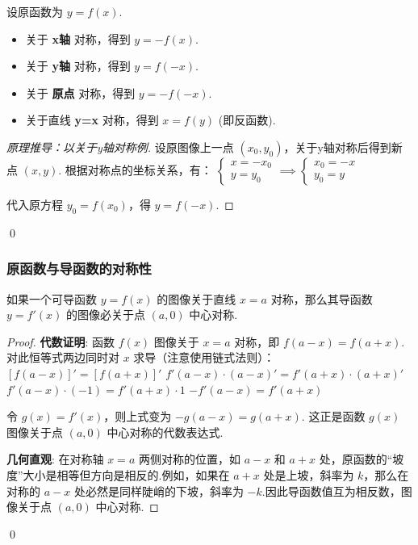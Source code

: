 \begin{theorem}[对称变换法则]
	设原函数为 $y=f(x)$.
	\begin{itemize}
		\item 关于 \textbf{x轴} 对称，得到 $y = -f(x)$.
		\item 关于 \textbf{y轴} 对称，得到 $y = f(-x)$.
		\item 关于 \textbf{原点} 对称，得到 $y = -f(-x)$.
		\item 关于直线 \textbf{y=x} 对称，得到 $x = f(y)$ (即反函数).
	\end{itemize}
\end{theorem}
\begin{proof}[原理推导：以关于y轴对称例]
	设原图像上一点 $(x_0, y_0)$，关于y轴对称后得到新点 $(x,y)$.
	根据对称点的坐标关系，有：
	$\begin{cases} x = -x_0 \\ y = y_0 \end{cases} \implies \begin{cases} x_0 = -x \\ y_0 = y \end{cases}$
	
	代入原方程 $y_0=f(x_0)$，得 $y=f(-x)$.
\end{proof}
\qed

\subsubsection*{原函数与导函数的对称性}
\begin{theorem}
	如果一个可导函数 $y=f(x)$ 的图像关于直线 $x=a$ 对称，那么其导函数 $y=f'(x)$ 的图像必关于点 $(a,0)$ 中心对称.
\end{theorem}
\begin{proof}
	\textbf{代数证明}:
	函数 $f(x)$ 图像关于 $x=a$ 对称，即 $f(a-x)=f(a+x)$.
	对此恒等式两边同时对 $x$ 求导（注意使用链式法则）：
	$[f(a-x)]' = [f(a+x)]'$
	$f'(a-x) \cdot (a-x)' = f'(a+x) \cdot (a+x)'$
	$f'(a-x) \cdot (-1) = f'(a+x) \cdot 1$
	$-f'(a-x) = f'(a+x)$
	
	令 $g(x) = f'(x)$，则上式变为 $-g(a-x)=g(a+x)$.
	这正是函数 $g(x)$ 图像关于点 $(a,0)$ 中心对称的代数表达式.
	
	\textbf{几何直观}:
	在对称轴 $x=a$ 两侧对称的位置，如 $a-x$ 和 $a+x$ 处，原函数的“坡度”大小是相等但方向是相反的.例如，如果在 $a+x$ 处是上坡，斜率为 $k$，那么在对称的 $a-x$ 处必然是同样陡峭的下坡，斜率为 $-k$.因此导函数值互为相反数，图像关于点 $(a,0)$ 中心对称.
\end{proof}
\qed


